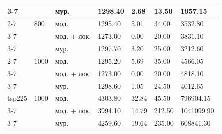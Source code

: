\begin{longtable}{|p{}|p{}|p{}|p{}|p{}|p{}|p{}|}
	\cline{3-7}
	& & мур. & 1298.40 & 2.68 & 13.50 & 1957.15 \\
	\cline{2-7}
	& 800 & мод. & 1295.40 & 5.01 & 34.00 & 3532.80 \\
	\cline{3-7}
	& & мод. + лок. & 1273.00 & 0.00 & 20.00 & 3831.10 \\
	\cline{3-7}
	& & мур. & 1297.70 & 3.20 & 25.00 & 3212.60 \\
	\cline{2-7}
	& 1000 & мод. & 1295.20 & 5.69 & 35.00 & 4566.05 \\
	\cline{3-7}
	& & мод. + лок. & 1273.00 & 0.00 & 20.00 & 4818.10 \\
	\cline{3-7}
	& & мур. & 1298.60 & 1.05 & 24.50 & 4012.65 \\
	\hline
	tsp225 & 1000 & мод. & 4303.80 & 32.84 & 45.50 & 796904.15 \\
	\cline{3-7}
	& & мод. + лок. & 3994.10 & 14.79 & 212.50 & 1041099.90 \\
	\cline{3-7}
	& & мур. & 4259.60 & 19.64 & 235.00 & 608841.30 \\
	\hline
\end{longtable}

